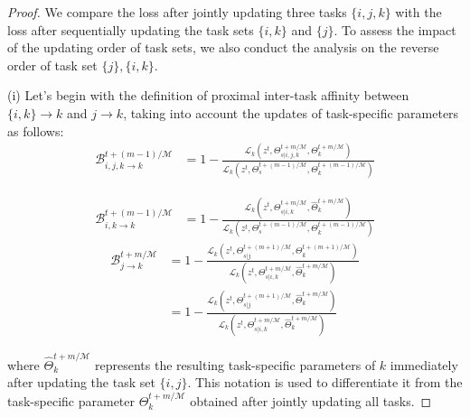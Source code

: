\theomfive*
\begin{proof}
We compare the loss after jointly updating three tasks $\{i, j, k\}$ with the loss after sequentially updating the task sets $\{i, k\}$ and $\{j\}$. To assess the impact of the updating order of task sets, we also conduct the analysis on the reverse order of task set $\{j\}, \{i, k\}$.

(i) Let's begin with the definition of proximal inter-task affinity between $\{i, k\}\rightarrow k$ and $j \rightarrow k$, taking into account the updates of task-specific parameters as follows:
\begin{align}
    \mathcal{B}_{i,j,k \rightarrow k}^{t+(m-1)/\mathcal{M}} &= 1-\frac{\mathcal{L}_k(z^t, \Theta_{s|i,j,k}^{t+m/\mathcal{M}}, \Theta_k^{t+m/\mathcal{M}})}{\mathcal{L}_k(z^t, \Theta_{s}^{t+(m-1)/\mathcal{M}}, \Theta_k^{t+(m-1)/\mathcal{M}})} \label{eq:theo5_joint}
\end{align}

\begin{align}
    \mathcal{B}_{i,k \rightarrow k}^{t+(m-1)/\mathcal{M}} &= 1-\frac{\mathcal{L}_k(z^t, \Theta_{s|i,k}^{t+m/\mathcal{M}}, \hat{\Theta}_k^{t+m/\mathcal{M}})}{\mathcal{L}_k(z^t, \Theta_{s}^{t+(m-1)/\mathcal{M}}, \Theta_k^{t+(m-1)/\mathcal{M}})}
\end{align}
\begin{align}
    \mathcal{B}_{j\rightarrow k}^{t+m/\mathcal{M}} &= 1-\frac{\mathcal{L}_k(z^t, \Theta_{s|j}^{t+(m+1)/\mathcal{M}}, \Theta_k^{t+(m+1)/\mathcal{M}})}{\mathcal{L}_k(z^t, \Theta_{s|i,k}^{t+m/\mathcal{M}}, \hat{\Theta}_k^{t+m/\mathcal{M}})}\\
    &= 1-\frac{\mathcal{L}_k(z^t, \Theta_{s|j}^{t+(m+1)/\mathcal{M}}, \hat{\Theta}_k^{t+m/\mathcal{M}})}{\mathcal{L}_k(z^t, \Theta_{s|i,k}^{t+m/\mathcal{M}}, \hat{\Theta}_k^{t+m/\mathcal{M}})}
\end{align}

where $\hat{\Theta}_k^{t+m/\mathcal{M}}$ represents the resulting task-specific parameters of $k$ immediately after updating the task set $\{i, j\}$. This notation is used to differentiate it from the task-specific parameter $\Theta_k^{t+m/\mathcal{M}}$ obtained after jointly updating all tasks.


\end{proof}
